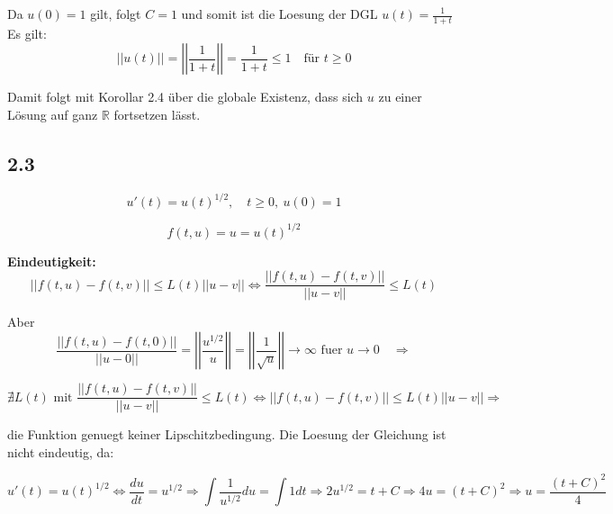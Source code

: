 \documentclass[10pt,oneside,a4paper]{scrartcl}
\begin{document}
		Da $u(0) = 1$ gilt, folgt $C= 1$ und somit ist die Loesung der DGL $u(t) = \frac{1}{1+t}$\\
		Es gilt: 
		\begin{equation*}
			\left| \left| u(t) \right| \right| = \left| \left| \frac{1}{1+t} \right| \right| = \frac{1}{1+t} \leq 1 \quad \text {für } t \geq 0
		\end{equation*}

		Damit folgt mit Korollar 2.4 über die globale Existenz, dass sich $u$ zu einer Lösung auf ganz $\mathbb{R}$ fortsetzen lässt.



 		\subsection*{2.3}

		\begin{equation*}
			u'(t) = u(t)^{1/2},\quad t \geq 0, \ u(0) = 1
		\end{equation*}

		\begin{equation*}
			f(t,u) = u =  u(t)^{1/2}
		\end{equation*}

		{\bf Eindeutigkeit:}
		\begin{equation*}
			||f(t,u) - f(t,v)|| \leq L(t) ||u - v||  \Leftrightarrow \frac{||f(t,u) - f(t,v)||}{ ||u - v|| } \leq L(t)
		\end{equation*}
		
		Aber 
		\begin{equation*}
			 \frac{||f(t,u) - f(t,0)||}{ ||u - 0|| } = \left | \left | \frac{u^{1/2}}{u} \right | \right | =  \left | \left |  \frac{1}{\sqrt{u}} \right | \right | \to \infty \text { fuer } u \to 0 \quad \Rightarrow
		\end{equation*}

		\begin{equation*}
		\nexists L(t) \text { mit } \frac{||f(t,u) - f(t,v)||}{ ||u - v|| } \leq L(t)  \Leftrightarrow ||f(t,u) - f(t,v)|| \leq L(t) ||u - v|| \Rightarrow
		\end{equation*}

		die Funktion genuegt keiner Lipschitzbedingung.\newline \newline
		Die Loesung der Gleichung ist nicht eindeutig, da:

		\begin{equation*}
			u'(t) = u(t)^{1/2} \Leftrightarrow \frac{du}{dt} = u^{1/2} \Rightarrow \int \frac{1}{u^{1/2}}du = \int 1 dt \Rightarrow 2u^{1/2} = t+C \Rightarrow 4u = (t+C)^2 \Rightarrow u = \frac{(t+C)^2}{4}
		\end{equation*}
\end{document}
